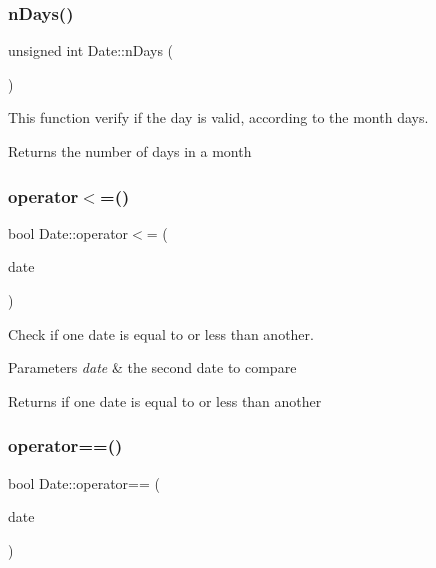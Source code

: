 \subsubsection{\texorpdfstring{n\+Days()}{nDays()}}
{\footnotesize\ttfamily unsigned int Date\+::n\+Days (\begin{DoxyParamCaption}{ }\end{DoxyParamCaption})\hspace{0.3cm}{\ttfamily [private]}}

This function verify if the day is valid, according to the month days. \begin{DoxyReturn}{Returns}
the number of days in a month 
\end{DoxyReturn}
\hypertarget{classDate_ab0656086910c8debe2a1fb5d2ae197ba}{}\label{classDate_ab0656086910c8debe2a1fb5d2ae197ba} 
\subsubsection{\texorpdfstring{operator$<$=()}{operator<=()}}
{\footnotesize\ttfamily bool Date\+::operator$<$= (\begin{DoxyParamCaption}\item[{const \hyperlink{classDate}{Date} \&}]{date }\end{DoxyParamCaption})}

Check if one date is equal to or less than another. 
\begin{DoxyParams}{Parameters}
{\em date} & the second date to compare \\
\hline
\end{DoxyParams}
\begin{DoxyReturn}{Returns}
if one date is equal to or less than another 
\end{DoxyReturn}
\hypertarget{classDate_a4b933e8c9e1a5853918ad88eb2fc2dae}{}\label{classDate_a4b933e8c9e1a5853918ad88eb2fc2dae} 
\subsubsection{\texorpdfstring{operator==()}{operator==()}}
{\footnotesize\ttfamily bool Date\+::operator== (\begin{DoxyParamCaption}\item[{const \hyperlink{classDate}{Date} \&}]{date }\end{DoxyParamCaption})}

